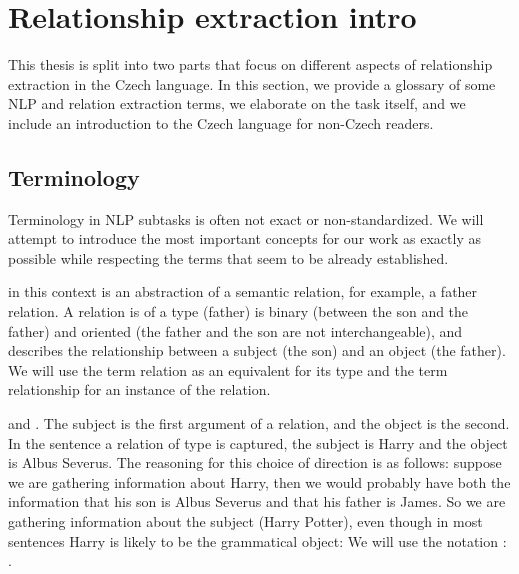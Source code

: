 \chapter{Relationship extraction intro} 

This thesis is split into two parts that focus on different aspects of relationship extraction in the Czech language. In this section, we provide a glossary of some NLP and relation extraction terms, we elaborate on the task itself, and we include an introduction to the Czech language for non-Czech readers.


\section{Terminology}
Terminology in NLP subtasks is often not exact or non-standardized. We will attempt to introduce the most important concepts for our work as exactly as possible while respecting the terms that seem to be already established. 


 in this context is an abstraction of a semantic relation, for example, a father relation. A relation is of a type (father) is binary (between the son and the father) and oriented (the father and the son are not interchangeable), and describes the relationship between a subject (the son) and an object (the father). We will use the term relation as an equivalent for its type and the term relationship for an instance of the relation. 


 and . The subject is the first argument of a relation, and the object is the second. In the sentence  a relation of type  is captured, the subject is Harry and the object is Albus Severus. The reasoning for this choice of direction is as follows: suppose we are gathering information about Harry, then we would probably have both the information that his son is Albus Severus and that his father is James. So we are gathering information about the subject (Harry Potter), even though in most sentences Harry is likely to be the grammatical object:  We will use the notation : . 

